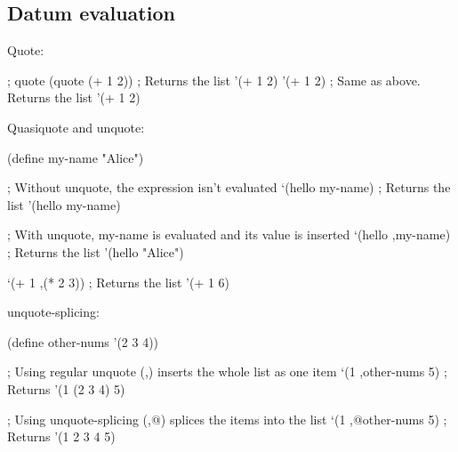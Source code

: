 \subsection{Datum evaluation}

Quote:

\begin{racketcode}
; quote
(quote (+ 1 2)) ; Returns the list '(+ 1 2)
'(+ 1 2)        ; Same as above. Returns the list '(+ 1 2)
\end{racketcode}

Quasiquote and unquote:

\begin{racketcode}
(define my-name "Alice")

; Without unquote, the expression isn't evaluated
`(hello my-name)          ; Returns the list '(hello my-name)

; With unquote, my-name is evaluated and its value is inserted
`(hello ,my-name)         ; Returns the list '(hello "Alice")

`(+ 1 ,(* 2 3))           ; Returns the list '(+ 1 6)
\end{racketcode}

unquote-splicing:

\begin{racketcode}
(define other-nums '(2 3 4))

; Using regular unquote (,) inserts the whole list as one item
`(1 ,other-nums 5)      ; Returns '(1 (2 3 4) 5)

; Using unquote-splicing (,@) splices the items into the list
`(1 ,@other-nums 5)     ; Returns '(1 2 3 4 5)
\end{racketcode}
